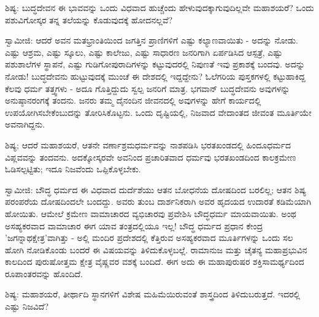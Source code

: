 ಶಿಷ್ಯ: ಬುದ್ಧದೇವನ ಈ ಭಾವವನ್ನು ಒಂದು ವಿಧವಾದ ಹುಚ್ಚೆಂದು ಹೇಳುವುದಕ್ಕಾಗುವುದಿಲ್ಲವೇ ಮಹಾಶಯರೆ? ಒಂದು ಪಶುವಿಗೋಸ್ಕರ ತನ್ನ ತಲೆಯನ್ನು ಕೊಡುವುದಕ್ಕೆ ಹೋದನಲ್ಲವೆ?

ಸ್ವಾಮೀಜಿ: ಆದರೆ ಅವನ ಮತಭ್ರಾಂತಿಯಿಂದ ಜಗತ್ತಿನ ಪ್ರಾಣಿಗಳಿಗೆ ಎಷ್ಟು ಕಲ್ಯಾಣವಾಯಿತು - ಅದನ್ನು ನೋಡು. ಎಷ್ಟು ಆಶ್ರಮ, ಎಷ್ಟು ಸ್ಕೂಲು, ಎಷ್ಟು ಕಾಲೇಜು, ಎಷ್ಟು ಸಾಧಾರಣ ಜನರಿಗಾಗಿ ಏರ್ಪಡಿಸಿದ ಆಸ್ಪತ್ರೆ, ಎಷ್ಟು ಪಶುಶಾಲೆಗಳ ಸ್ಥಾಪನೆ, ಎಷ್ಟು ಗುಡಿಗೋಪುರಾದಿಗಳನ್ನು ಕಟ್ಟುವುದರಲ್ಲಿ ನಿಪುಣತೆ ಇವು ಪ್ರಕಾಶಕ್ಕೆ ಬಂದವು. ಅದನ್ನು ನೋಡು! ಬುದ್ಧದೇವನು ಹುಟ್ಟುವುದಕ್ಕೆ ಮುಂಚೆ ಈ ದೇಶದಲ್ಲಿ ಇದ್ದದ್ದೇನು? ಓಲೆಗರಿಯ ಪುಸ್ತಕಗಳಲ್ಲಿ ಕಟ್ಟುಹಾಕಿದ್ದ ಕೆಲವು ಧರ್ಮ ತತ್ತ್ವಗಳು - ಅದೂ ಗೊತ್ತಿದ್ದುದು ಸ್ವಲ್ಪ ಜನರಿಗೆ ಮಾತ್ರ. ಭಗವಾನ್ ಬುದ್ಧದೇವನು ಅವುಗಳನ್ನು ಅನುಷ್ಠಾನರಂಗಕ್ಕೆ ತಂದನು. ಜನರು ತಮ್ಮ ದೈನಂದಿನ ಜೀವನದಲ್ಲಿ ಅವುಗಳನ್ನು ಹೇಗೆ ಕಾರ್ಯದಲ್ಲಿ ಉಪಯೋಗಿಸಬೇಕೆಂಬುದನ್ನು ತೋರಿಸಿಕೊಟ್ಟನು. ಒಂದು ದೃಷ್ಟಿಯಲ್ಲಿ, ನಿಜವಾದ ವೇದಾಂತದ ಜೀವಂತ ಮೂರ್ತಿಯೇ ಅವನಾಗಿದ್ದನು.

ಶಿಷ್ಯ; ಆದರೆ ಮಹಾಶಯರೆ, ಆತನೇ ವರ್ಣಾಶ್ರಮಧರ್ಮವನ್ನು ನಾಶಪಡಿಸಿ ಭರತಖಂಡದಲ್ಲಿ ಹಿಂದೂಧರ್ಮದ ವಿಪ್ಲವವನ್ನು ತಂದವನು. ಅದಕ್ಕೋಸ್ಕರವೇ ಅವನಿಂದ ಪ್ರಚಾರಿತವಾದ ಧರ್ಮವು ಭರತಖಂಡದಿಂದ ಕಾಲಕ್ರಮೇಣ ಓಡಿಸಲ್ಪಟ್ಟಿತು; ಇದೂ ನಿಜವೆಂದು ಒಪ್ಪಿಕೊಳ್ಳಬೇಕು.

ಸ್ವಾಮೀಜಿ: ಬೌದ್ಧ ಧರ್ಮದ ಈ ವಿಧವಾದ ದುರ್ದೆಶೆಯು ಆತನ ಬೋಧನೆಯ ದೋಷದಿಂದ ಬರಲಿಲ್ಲ; ಆತನ ಶಿಷ್ಯ ಪರಂಪರೆಯ ದೋಷದಿಂದಲೇ ಬಂದದ್ದು. ಅವರು ತುಂಬ ದಾರ್ಶನಿಕರಾಗಿ ಅವರ ಹೃದಯದ ಉದಾರತೆ ಕಡಿಮೆಯಾಗಿ ಹೋಯಿತು. ಆಮೇಲೆ ಕ್ರಮೇಣ ವಾಮಾಚಾರದ ವ್ಯಭಿಚಾರವು ಪ್ರವೇಶಿಸಿ ಬೌದ್ಧಧರ್ಮ ಮಾಯವಾಯಿತು. ಅಂಥ ಅಸಹ್ಯಕರವಾದ ವಾಮಾಚಾರ ಈಗ ಯಾವ ತಂತ್ರದಲ್ಲಿಯೂ ಇಲ್ಲ! ಬೌದ್ಧ ಧರ್ಮದ ಪ್ರಧಾನ ಕೇಂದ್ರ 'ಜಗನ್ನಾಥಕ್ಷೇತ್ರ'ವಾಗಿತ್ತು - ಅಲ್ಲಿ ಮಂದಿರ ಪ್ರದೇಶದಲ್ಲಿ ಕೆತ್ತಿರುವ ಅಸಹ್ಯಕರವಾದ ಮೂರ್ತಿಗಳನ್ನು ಒಂದು ಸಲ ಹೋಗಿ ನೋಡಿಕೊಂಡು ಬಂದರೆ ಈ ವಿಷಯವನ್ನು ತಿಳಿದುಕೊಳ್ಳಬಲ್ಲೆ. ರಾಮಾನುಜ ಮತ್ತು ಚೈತನ್ಯ ಮಹಾಪ್ರಭುವಿನ ಕಾಲದಿಂದ ಪುರುಷೋತ್ತಮ ಕ್ಷೇತ್ರ ವೈಷ್ಣವರ ವಶಕ್ಕೆ ಬಂದಿದೆ. ಈಗ ಅದು ಈ ಮಹಾಪುರುಷರ ಶಕ್ತಿಸಾಮರ್ಥ್ಯದಿಂದ ರೂಪಾಂತರವನ್ನು ಹೊಂದಿದೆ.

ಶಿಷ್ಯ: ಮಹಾಶಯರೆ, ತೀರ್ಥಾದಿ ಸ್ಥಾನಗಳಿಗೆ ವಿಶೇಷ ಮಹಿಮೆಯಿರುವಂತೆ ಶಾಸ್ತ್ರದಿಂದ ತಿಳಿದುಬರುತ್ತದೆ. ಇದರಲ್ಲಿ ಎಷ್ಟು ನಿಜವಿದೆ?

